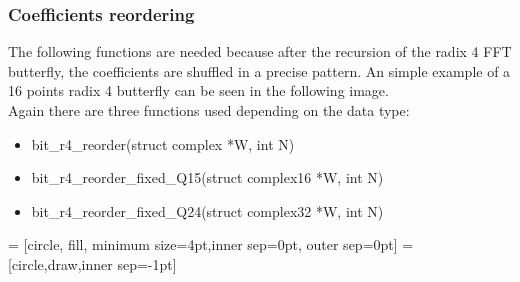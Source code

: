 \documentclass[a4paper]{article}
\begin{document}
\subsubsection{Coefficients reordering}
The following functions are needed because after the recursion of the radix 4 FFT butterfly, the coefficients are shuffled in a precise pattern. An simple example of a 16 points radix 4 butterfly can be seen in the following image.\\ 
Again there are three functions used depending on the data type:
\begin{itemize}
	\item bit\_r4\_reorder(struct complex *W, int N)
	\item bit\_r4\_reorder\_fixed\_Q15(struct complex16 *W, int N)
	\item bit\_r4\_reorder\_fixed\_Q24(struct complex32 *W, int N)
\end{itemize}



= [circle, fill, minimum size=4pt,inner sep=0pt, outer sep=0pt]
 = [circle,draw,inner sep=-1pt]
\end{document}
